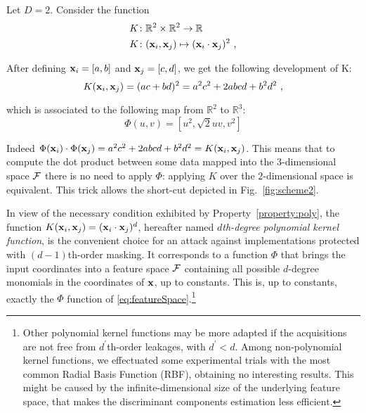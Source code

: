 \begin{example}\label{ex:polyKernel}
Let $D=2$. Consider the function
\begin{align}
&K\colon\mathbb{R}^2\times \mathbb{R}^2 \rightarrow \mathbb{R} \nonumber \\ 
&K\colon(\textbf{x}_i,\textbf{x}_j) \mapsto ( \textbf{x}_i\cdot \textbf{x}_j)^2 \mbox{ ,} \label{eq:example1}
\end{align}

After defining $\textbf{x}_i = [a,b]$ and $\textbf{x}_j = [c,d]$, we get the following development of K:
\begin{equation}
K(\textbf{x}_i,\textbf{x}_j) = (ac + bd)^2 = a^2c^2 + 2abcd + b^2d^2 \mbox{ ,}
\end{equation}

which is associated to the following map from $\mathbb{R}^2$ to $\mathbb{R}^3$:
\begin{equation}
\Phi(u,v) =  [u^2, \sqrt{2}uv, v^2]
\end{equation}

Indeed $\Phi(\textbf{x}_i)\cdot \Phi(\textbf{x}_j) = a^2c^2 + 2abcd + b^2d^2 = K(\textbf{x}_i,\textbf{x}_j)$\enspace. This means that to compute the dot product between some data mapped into the $3$-dimensional space $\mathcal{F}$ there is no need to apply $\Phi$: applying $K$ over the $2$-dimensional space is equivalent. This trick allows the short-cut depicted in Fig.~\ref{fig:scheme2}.

\end{example}



In view of the necessary condition exhibited by Property~\ref{property:poly},  the function $K(\textbf{x}_i,\textbf{x}_j) = (\textbf{x}_i \cdot \textbf{x}_j)^d$, hereafter named \emph{$d$th-degree polynomial kernel function}, is the convenient choice for an attack against implementations protected with $(d-1)$th-order masking. It corresponds to a function $\Phi$ that brings the input coordinates into a feature space $\mathcal{F}$ containing all possible $d$-degree monomials in the coordinates of $\textbf{x}$, up to constants. This is, up to constants, exactly the $\Phi$ function of \eqref{eq:featureSpace}.\footnote{Other polynomial kernel functions may be more adapted if the acquisitions are not free from $d^\prime$th-order leakages, with $d^\prime<d$. Among non-polynomial kernel functions, we effectuated some experimental trials with the most common Radial Basis Function (RBF), obtaining no interesting results. This might be caused by the infinite-dimensional size of the underlying feature space, that makes the discriminant components estimation less efficient.}\\ 


